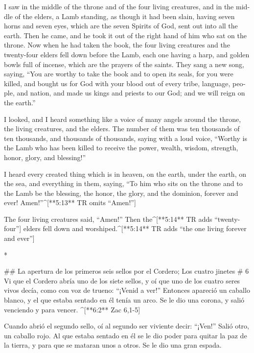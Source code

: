 \begin{paracols}{2}
\begin{english}
 I saw in the middle of the throne and of the four living creatures, and in the middle of the elders, a Lamb standing, as though it had been slain, having seven horns and seven eyes, which are the seven Spirits of God, sent out into all the earth.  Then he came, and he took it out of the right hand of him who sat on the throne.  Now when he had taken the book, the four living creatures and the twenty-four elders fell down before the Lamb, each one having a harp, and golden bowls full of incense, which are the prayers of the saints.  They sang a new song, saying, “You are worthy to take the book and to open its seals, for you were killed, and bought us for God with your blood out of every tribe, language, people, and nation,  and made us kings and priests to our God; and we will reign on the earth.” 

 I looked, and I heard something like a voice of many angels around the throne, the living creatures, and the elders. The number of them was ten thousands of ten thousands, and thousands of thousands,  saying with a loud voice, “Worthy is the Lamb who has been killed to receive the power, wealth, wisdom, strength, honor, glory, and blessing!” 

 I heard every created thing which is in heaven, on the earth, under the earth, on the sea, and everything in them, saying, “To him who sits on the throne and to the Lamb be the blessing, the honor, the glory, and the dominion, forever and ever! Amen!”^[**5:13** TR omits “Amen!”] 

 The four living creatures said, “Amen!” Then the^[**5:14** TR adds “twenty-four”] elders fell down and worshiped.^[**5:14** TR adds “the one living forever and ever”]

\end{english}
\switchcolumn[0]*

## La apertura de los primeros seis sellos por el Cordero; Los cuatro jinetes
# 6
 Vi que el Cordero abría uno de los siete sellos, y oí que uno de los cuatro seres vivos decía, como con voz de trueno: “¡Venid a ver!”  Entonces apareció un caballo blanco, y el que estaba sentado en él tenía un arco. Se le dio una corona, y salió venciendo y para vencer. ^[**6:2** Zac 6,1-5]

 Cuando abrió el segundo sello, oí al segundo ser viviente decir: “¡Ven!”  Salió otro, un caballo rojo. Al que estaba sentado en él se le dio poder para quitar la paz de la tierra, y para que se mataran unos a otros. Se le dio una gran espada.


\end{paracols}
